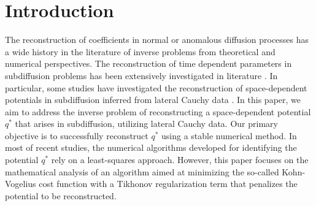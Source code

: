 \documentclass[a4paper,12pt,reqno,natbib]{amsart}
\begin{document}
\maketitle
\pagestyle{myheadings} \thispagestyle{plain} \markboth{}{}


\section{Introduction}


The reconstruction of coefficients in normal or anomalous diffusion processes has a wide history in the literature of inverse problems from theoretical and numerical perspectives. The reconstruction of time dependent parameters in subdiffusion problems has been extensively investigated in literature \cite{hendy2022reconstruction1,hendy2022reconstruction2,jin2024numerical}. 
In particular, some studies have investigated the reconstruction of space-dependent potentials in subdiffusion inferred from lateral Cauchy data \cite{jin2021recovering,jing2021simultaneous,Kain2021MA,rundell2023uniqueness10}. In this paper, we aim to address the inverse problem of reconstructing a space-dependent potential $q^*$  that arises in subdiffusion, utilizing lateral Cauchy data. Our primary objective is to successfully reconstruct $q^*$ using a stable numerical method. In most of recent studies, the numerical algorithms developed for identifying the potential $q^*$ rely on a least-squares approach. However, this paper focuses on the mathematical analysis of an algorithm aimed at minimizing the so-called Kohn-Vogelius cost function with a Tikhonov regularization term that penalizes the potential to be reconstructed.
\end{document}
